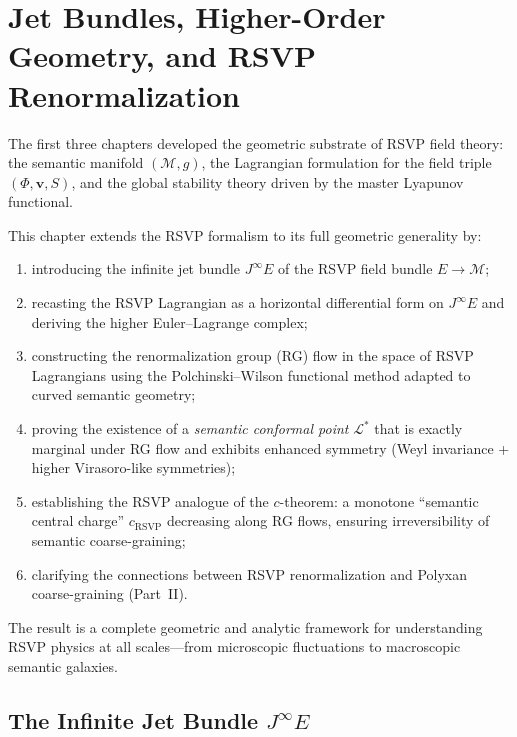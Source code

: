 \chapter{Jet Bundles, Higher-Order Geometry, and RSVP Renormalization}
\label{ch:jet-renormalization}

The first three chapters developed the geometric substrate of RSVP field theory:
the semantic manifold $(\mathcal{M},g)$, the Lagrangian formulation for the field
triple $(\Phi,\mathbf{v},S)$, and the global stability theory driven by the
master Lyapunov functional.  

This chapter extends the RSVP formalism to its full geometric generality by:

\begin{enumerate}
  \item introducing the infinite jet bundle $J^\infty E$ of the RSVP field
        bundle $E\to\mathcal{M}$;
  \item recasting the RSVP Lagrangian as a horizontal differential form on
        $J^\infty E$ and deriving the higher Euler--Lagrange complex;
  \item constructing the renormalization group (RG) flow in the space of
        RSVP Lagrangians using the Polchinski--Wilson functional method adapted
        to curved semantic geometry;
  \item proving the existence of a \emph{semantic conformal point} $\mathcal{L}^\ast$
        that is exactly marginal under RG flow and exhibits enhanced symmetry
        (Weyl invariance + higher Virasoro-like symmetries);
  \item establishing the RSVP analogue of the $c$-theorem: a monotone
        ``semantic central charge'' $c_{\mathrm{RSVP}}$ decreasing along RG flows,
        ensuring irreversibility of semantic coarse-graining;
  \item clarifying the connections between RSVP renormalization and Polyxan
        coarse-graining (Part~II).
\end{enumerate}

The result is a complete geometric and analytic framework for understanding
RSVP physics at all scales---from microscopic fluctuations to macroscopic
semantic galaxies.

\section{The Infinite Jet Bundle \(J^\infty E\)}


